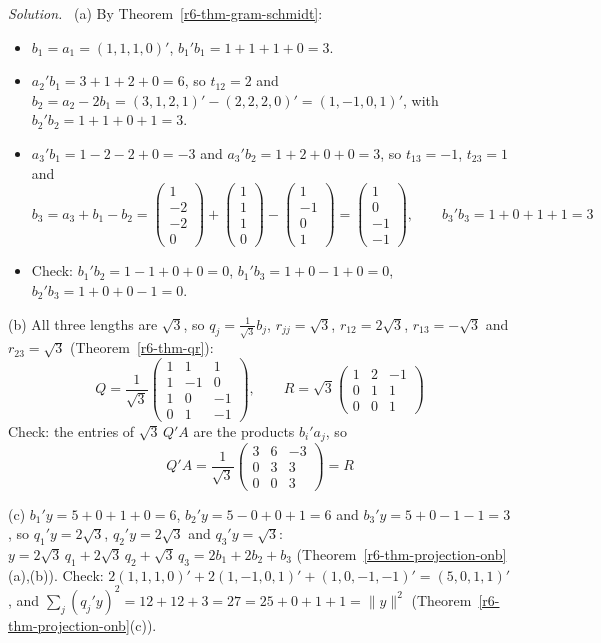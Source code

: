 \documentclass[12pt]{article}
\theoremstyle{definition}
\newenvironment{solution}{\par\noindent\textit{Solution.}\ }{\par\smallskip}
\begin{document}
\begin{solution}
(a) By Theorem~\ref{r6-thm-gram-schmidt}:
\begin{itemize}
\item \(b_1=a_1=(1,1,1,0)'\), \(b_1'b_1=1+1+1+0=3\).
\item \(a_2'b_1=3+1+2+0=6\), so \(t_{12}=2\) and \(b_2=a_2-2b_1=(3,1,2,1)'-(2,2,2,0)'=(1,-1,0,1)'\), with
\(b_2'b_2=1+1+0+1=3\).
\item \(a_3'b_1=1-2-2+0=-3\) and \(a_3'b_2=1+2+0+0=3\), so \(t_{13}=-1\), \(t_{23}=1\) and
\[
b_3=a_3+b_1-b_2=\begin{pmatrix}1\\-2\\-2\\0\end{pmatrix}+\begin{pmatrix}1\\1\\1\\0\end{pmatrix}-\begin{pmatrix}1\\-1\\0\\1\end{pmatrix}
=\begin{pmatrix}1\\0\\-1\\-1\end{pmatrix},\qquad b_3'b_3=1+0+1+1=3
\]
\item Check: \(b_1'b_2=1-1+0+0=0\), \(b_1'b_3=1+0-1+0=0\), \(b_2'b_3=1+0+0-1=0\).
\end{itemize}
(b) All three lengths are \(\sqrt3\), so \(q_j=\frac1{\sqrt3}b_j\), \(r_{jj}=\sqrt3\), \(r_{12}=2\sqrt3\),
\(r_{13}=-\sqrt3\) and \(r_{23}=\sqrt3\) (Theorem~\ref{r6-thm-qr}):
\[
Q=\frac1{\sqrt3}\begin{pmatrix}1&1&1\\1&-1&0\\1&0&-1\\0&1&-1\end{pmatrix},\qquad
R=\sqrt3\begin{pmatrix}1&2&-1\\0&1&1\\0&0&1\end{pmatrix}
\]
Check: the entries of \(\sqrt3\,Q'A\) are the products \(b_i'a_j\), so
\[
Q'A=\frac1{\sqrt3}\begin{pmatrix}3&6&-3\\0&3&3\\0&0&3\end{pmatrix}=R
\]

(c) \(b_1'y=5+0+1+0=6\), \(b_2'y=5-0+0+1=6\) and \(b_3'y=5+0-1-1=3\), so \(q_1'y=2\sqrt3\), \(q_2'y=2\sqrt3\) and
\(q_3'y=\sqrt3\): \(y=2\sqrt3\,q_1+2\sqrt3\,q_2+\sqrt3\,q_3=2b_1+2b_2+b_3\)
(Theorem~\ref{r6-thm-projection-onb}(a),(b)). Check: \(2(1,1,1,0)'+2(1,-1,0,1)'+(1,0,-1,-1)'=(5,0,1,1)'\), and
\(\sum_j(q_j'y)^2=12+12+3=27=25+0+1+1=\lVert y\rVert^2\) (Theorem~\ref{r6-thm-projection-onb}(c)).
\end{solution}
\end{document}
